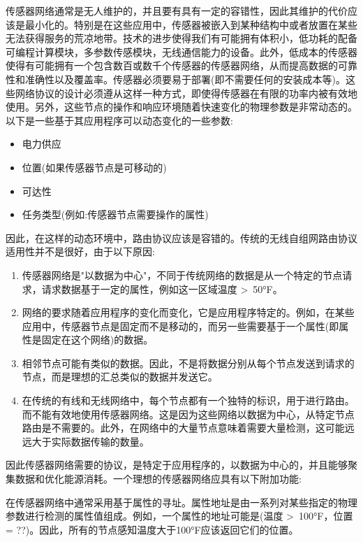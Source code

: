 \documentclass[journal]{IEEEtran}
\begin{document}
\begin{CJK}{UTF8}{gbsn}
传感器网络通常是无人维护的，并且要有具有一定的容错性，因此其维护的代价应该是最小化的。特别是在这些应用中，传感器被嵌入到某种结构中或者放置在某些无法获得服务的荒凉地带。技术的进步使得我们有可能拥有体积小，低功耗的配备可编程计算模块，多参数传感模块，无线通信能力的设备。此外，低成本的传感器使得有可能拥有一个包含数百或数千个传感器的传感器网络，从而提高数据的可靠性和准确性以及覆盖率。传感器必须要易于部署(即不需要任何的安装成本等)。这些网络协议的设计必须遵从这样一种方式，即使得传感器在有限的功率内被有效地使用。另外，这些节点的操作和响应环境随着快速变化的物理参数是非常动态的。以下是一些基于其应用程序可以动态变化的一些参数:

\begin{itemize}
  \item 电力供应
  \item 位置(如果传感器节点是可移动的)  
  \item 可达性
  \item 任务类型(例如:传感器节点需要操作的属性)

\end{itemize}

因此，在这样的动态环境中，路由协议应该是容错的。传统的无线自组网路由协议适用性并不是很好，由于以下原因:

\begin{enumerate}
 \setcounter{enumi}
 \item 传感器网络是"以数据为中心"，不同于传统网络的数据是从一个特定的节点请求，请求数据基于一定的属性，例如这一区域温度 \textgreater\ 50°F。
 \item 网络的要求随着应用程序的变化而变化，它是应用程序特定的。例如，在某些应用中，传感器节点是固定而不是移动的，而另一些需要基于一个属性(即属性是固定在这个网络)的数据。
 \item 相邻节点可能有类似的数据。因此，不是将数据分别从每个节点发送到请求的节点，而是理想的汇总类似的数据并发送它。
 \item 在传统的有线和无线网络中，每个节点都有一个独特的标识，用于进行路由。而不能有效地使用传感器网络。这是因为这些网络以数据为中心，从特定节点路由是不需要的。此外，在网络中的大量节点意味着需要大量检测，这可能远远大于实际数据传输的数量。

\end{enumerate}

 因此传感器网络需要的协议，是特定于应用程序的，以数据为中心的，并且能够聚集数据和优化能源消耗。一个理想的传感器网络应具有以下附加功能:
 
 在传感器网络中通常采用基于属性的寻址。属性地址是由一系列对某些指定的物理参数进行检测的属性值组成。例如，一个属性的地址可能是(温度 \textgreater\ 100°F，位置 = ??)。因此，所有的节点感知温度大于100°F应该返回它们的位置。


\end{CJK}
\end{document}
